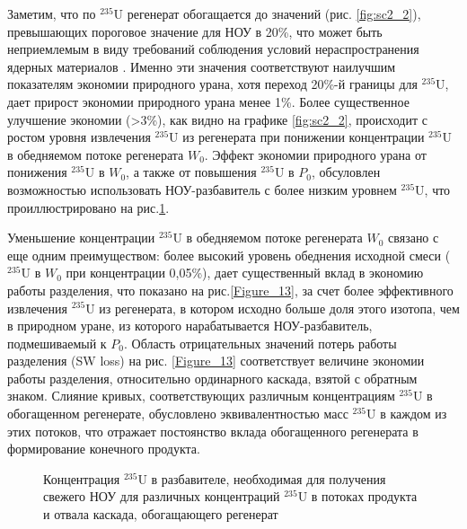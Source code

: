 Заметим, что по $^{235}$U регенерат обогащается до значений (рис.  \ref{fig:sc2_2}), превышающих пороговое значение для НОУ в 20\%, что может быть неприемлемым в виду требований соблюдения условий нераспространения ядерных материалов \cite{brownOriginsSignificanceLimit2016}. Именно эти значения соответствуют наилучшим показателям экономии природного урана, хотя переход 20\%-й границы для $^{235}$U, дает прирост экономии природного урана менее 1\%. Более существенное улучшение экономии (>3\%), как видно на графике \ref{fig:sc2_2}, происходит с ростом уровня извлечения $^{235}$U из регенерата при понижении концентрации $^{235}$U в обедняемом потоке регенерата $W_0$. Эффект экономии природного урана от понижения $^{235}$U в $W_0$, а также от повышения $^{235}$U в $P_0$, обсуловлен возможностью использовать НОУ-разбавитель с более низким уровнем $^{235}$U, что проиллюстрировано на рис.\ref{fig:sc2_LEU_D}.

Уменьшение концентрации $^{235}$U в обедняемом потоке регенерата $W_0$ связано с еще одним преимуществом: более высокий уровень обеднения исходной смеси ($^{235}$U в $W_0$ при концентрации 0,05\%), дает существенный вклад в экономию работы разделения, что показано на рис.\ref{Figure_13}, за счет более эффективного извлечения $^{235}$U из регенерата, в котором исходно больше доля этого изотопа, чем в природном уране, из которого нарабатывается НОУ-разбавитель, подмешиваемый к $P_0$. Область отрицательных значений потерь работы разделения (SW loss) на рис. \ref{Figure_13} соответствует величине экономии работы разделения, относительно ординарного каскада, взятой с обратным знаком. Слияние кривых, соответствующих различным концентрациям $^{235}$U в обогащенном регенерате, обусловлено эквивалентностью масс $^{235}$U в каждом из этих потоков, что отражает постоянство вклада обогащенного регенерата в формирование конечного продукта.

\begin{figure}[ht]
  \caption{Концентрация $^{235}$U в разбавителе, необходимая для получения свежего НОУ для различных концентраций $^{235}$U в потоках продукта и отвала каскада, обогащающего регенерат}\label{fig:sc2_LEU_D}
\end{figure}

